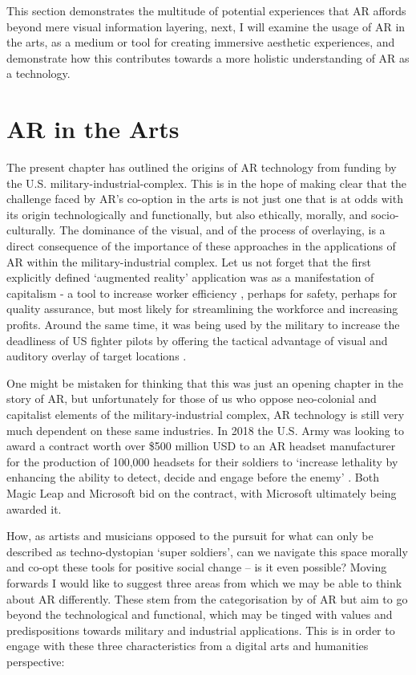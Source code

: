 This section demonstrates the multitude of potential experiences that AR affords beyond mere visual information layering, next, I will examine the usage of AR in the arts, as a medium or tool for creating immersive aesthetic experiences, and demonstrate how this contributes towards a more holistic understanding of AR as a technology. 



\section{AR in the Arts}\label{sec: ar-arts}
The present chapter has outlined the origins of AR technology from funding by the U.S. military-industrial-complex. This is in the hope of making clear that the challenge faced by AR's co-option in the arts is not just one that is at odds with its origin technologically and functionally, but also ethically, morally, and socio-culturally. The dominance of the visual, and of the process of overlaying, is a direct consequence of the importance of these approaches in the applications of AR within the military-industrial complex. Let us not forget that the first explicitly defined `augmented reality' application was as a manifestation of capitalism - a tool to increase worker efficiency \citep{caudell1992}, perhaps for safety, perhaps for quality assurance, but most likely for streamlining the workforce and increasing profits. Around the same time, it was being used by the military to increase the deadliness of US fighter pilots by offering the tactical advantage of visual and auditory overlay of target locations \citep{wanstall1989}. %

One might be mistaken for thinking that this was just an opening chapter in the story of AR, but unfortunately for those of us who oppose neo-colonial and capitalist elements of the military-industrial complex, AR technology is still very much dependent on these same industries. In 2018 the U.S. Army was looking to award a contract worth over \$500 million USD to an AR headset manufacturer for the production of 100,000 headsets for their soldiers to `increase lethality by enhancing the ability to detect, decide and engage before the enemy' \citep{brustein2018}. Both Magic Leap and Microsoft bid on the contract, with Microsoft ultimately being awarded it.

How, as artists and musicians opposed to the pursuit for what can only be described as techno-dystopian `super soldiers', can we navigate this space morally and co-opt these tools for positive social change -- is it even possible? Moving forwards I would like to suggest three areas from which we may be able to think about AR differently. These stem from the categorisation by \citep{azuma1997} of AR but aim to go beyond the technological and functional, which may be tinged with values and predispositions towards military and industrial applications. This is in order to engage with these three characteristics from a digital arts and humanities perspective:

